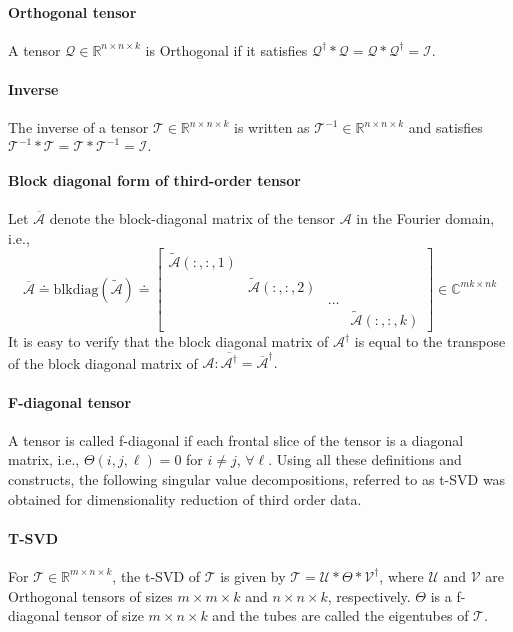 \documentclass[format=acmsmall, review=false, screen=true]{acmart}
\begin{document}
\paragraph{Orthogonal tensor} A tensor $\mathcal{Q} \in \mathbb{R}^{n
\times n \times k}$ is Orthogonal if it satisfies
$\mathcal{Q}^{\dagger} * \mathcal{Q} = \mathcal{Q} *
\mathcal{Q}^{\dagger} = \mathcal{I}$.
\paragraph{Inverse} The inverse of a tensor $\mathcal{T} \in
\mathbb{R}^{n \times n \times k} $ is written as $\mathcal{T}^{-1} \in
\mathbb{R}^{n \times n \times k} $ and satisfies $\mathcal{T}^{-1}
*\mathcal{T} = \mathcal{T} * \mathcal{T}^{-1} = \mathcal{I}.$
\paragraph{Block diagonal form of third-order tensor} Let
$\overline{\mathcal{A}}$ denote the block-diagonal matrix of the tensor
$\mathcal{A}$ in the Fourier domain, i.e.,
\[
    \overline{\mathcal{A}} \doteq \mathrm{blkdiag}(\widetilde{\mathcal{A}}) \doteq
\begin{bmatrix}
    \widetilde{\mathcal{A}}(:, :, 1) & & &\\
    & \widetilde{\mathcal{A}}(:, :, 2) & &\\
    & & \dots &\\
    & & & \widetilde{\mathcal{A}}(:, :, k)
\end{bmatrix}
\in \mathbb{C}^{mk \times nk}
\]
It is easy to verify that the block diagonal matrix of
$\mathcal{A}^\dagger$ is equal to the transpose of the block diagonal
matrix of
$\mathcal{A}: \overline{\mathcal{A}^{\dagger}} = {\overline{\mathcal{A}}}^{\dagger}. $
\paragraph{F-diagonal tensor} A tensor is called f-diagonal if each
frontal slice of the tensor is a diagonal matrix, i.e., $\Theta(i, j, \ell)
= 0$ for $i \neq j$, $\forall \ell$.
Using all these definitions and constructs, the
following singular value decompositions, referred to as t-SVD was
obtained for dimensionality reduction of third order data.
\paragraph{T-SVD}For $\mathcal{T} \in \mathbb{R}^{m \times n \times
k}$, the t-SVD of $\mathcal{T}$ is given by $\mathcal{T} =
\mathcal{U} * \Theta * \mathcal{V}^{\dagger}$, where $\mathcal{U}$ and
$\mathcal{V}$ are Orthogonal tensors of sizes $m \times m \times k$
and $n \times n \times k$, respectively. $\Theta$ is a f-diagonal
tensor of size $m \times n \times k$ and the tubes are called the
eigentubes of $\mathcal{T}$.
\end{document}
